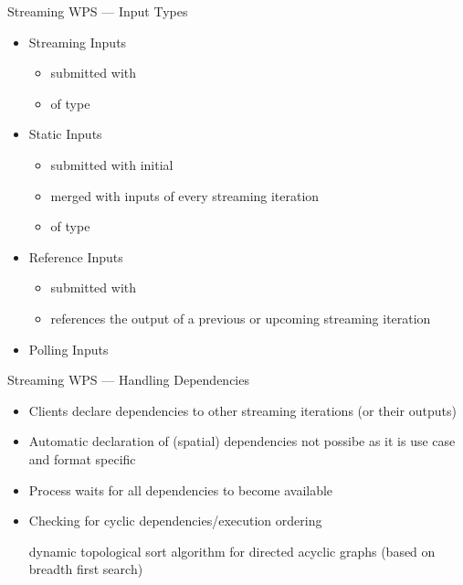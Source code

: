 \documentclass[xcolor=svgnames,professionalfonts,11pt,aspectratio=43,handout]{beamer}
\begin{document}
\begin{frame}{Streaming WPS --- Input Types}
  \begin{itemize}
    \item Streaming Inputs
    \begin{itemize}
      \item submitted with 
      \item of type 
    \end{itemize}
    \pause
    \item Static Inputs
    \begin{itemize}
      \item submitted with initial 
      \item merged with inputs of every streaming iteration
      \item of type 
    \end{itemize}
    \pause
    \item Reference Inputs
    \begin{itemize}
      \item submitted with 
      \item references the output of a previous or upcoming streaming iteration
    \end{itemize}
    \pause
    \item Polling Inputs
  \end{itemize}
\end{frame}

\begin{frame}[t]{Streaming WPS --- Handling Dependencies}
  \begin{itemize}
    \item Clients declare dependencies to other streaming iterations (or their outputs)
    \item Automatic declaration of (spatial) dependencies not possibe as it is use case and format specific
    \item Process waits for all dependencies to become available
    \item Checking for cyclic dependencies/execution ordering
    \pause
    \begin{itemize}
      \arrow dynamic topological sort algorithm for directed acyclic graphs (based on breadth first search)
    \end{itemize}
  \end{itemize}
\end{frame}
\end{document}
